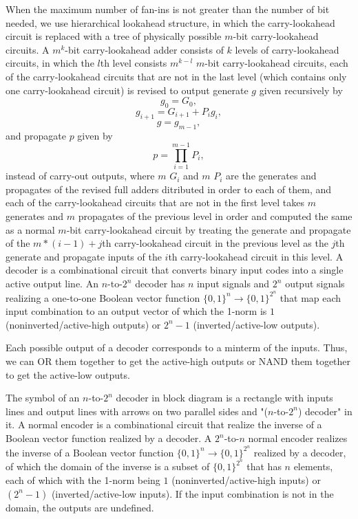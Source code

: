 \documentclass[a4paper,12pt]{article}
\begin{document}
\begin{itemize}
\begin{itemize}
\begin{itemize}
\begin{itemize}
\begin{itemize}
\begin{itemize}
\begin{itemize}
When the maximum number of fan-ins is not greater than the number of bit needed, we use hierarchical lookahead structure, in which the carry-lookahead circuit is replaced with a tree of physically possible $m$-bit carry-lookahead circuits. A $m^k$-bit carry-lookahead adder consists of $k$ levels of carry-lookahead circuits, in which the $l$th level consists $m^{k-l}$ $m$-bit carry-lookahead circuits, each of the carry-lookahead circuits that are not in the last level (which contains only one
carry-lookahead circuit) is revised to output generate $g$ given recursively by
\[g_0=G_0,\]
\[g_{i+1}=G_{i+1}+P_ig_i,\]
\[g=g_{m-1},\]
and propagate $p$ given by
\[p=\prod_{i=1}^{m-1}P_i,\]
instead of carry-out outputs, where $m$ $G_i$ and $m$ $P_i$ are the generates and propagates of the revised full adders ditributed in order to each of them, and each of the carry-lookahead circuits that are not in the first level takes $m$ generates and $m$ propagates of the previous level in order and computed the same as a normal $m$-bit carry-lookahead circuit by treating the generate and propagate of the $m*(i-1)+j$th carry-lookahead circuit in the previous level as the $j$th generate and propagate inputs of the $i$th carry-lookahead circuit in this level.
A decoder is a combinational circuit that converts binary input codes into a single active output line. An $n$-to-$2^n$ decoder has $n$ input signals and $2^n$ output signals realizing a one-to-one Boolean vector function $\{0,1\}^n\to\{0,1\}^{2^n}$ that map each input combination to an output vector of which the 1-norm is $1$ (noninverted/active-high outputs) or $2^n-1$ (inverted/active-low outputs).

Each possible output of a decoder corresponds to a minterm of the inputs. Thus, we can OR them together to get the active-high outputs or NAND them together to get the active-low outputs.

The symbol of an $n$-to-$2^n$ decoder in block diagram is a rectangle with inputs lines and output lines with arrows on two parallel sides and "($n$-to-$2^n$) decoder" in it.
A normal encoder is a combinational circuit that realize the inverse of a Boolean vector function realized by a decoder. A $2^n$-to-$n$ normal encoder realizes the inverse of a Boolean vector function $\{0,1\}^n\to\{0,1\}^{2^n}$ realized by a decoder, of which the domain of the inverse is a subset of $\{0,1\}^{2^n}$ that has $n$ elements, each of which with the 1-norm being $1$ (noninverted/active-high inputs) or $(2^n-1)$ (inverted/active-low inputs). If the input combination is not in the domain, the outputs are undefined.


\end{itemize}
\end{itemize}
\end{itemize}
\end{itemize}
\end{itemize}
\end{itemize}
\end{itemize}
\end{document}
